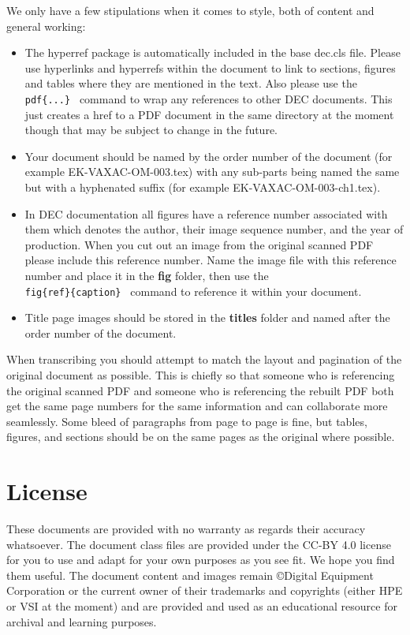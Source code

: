 \documentclass{dec}
\begin{document}
We only have a few stipulations when it comes to style, both of content and general working:

\begin{itemize}

\item	The hyperref package is automatically included in the base dec.cls file. Please use hyperlinks and hyperrefs within the document
		to link to sections, figures and tables where they are mentioned in the text. Also please use the {\tt \\pdf\{...\}\ } command to
		wrap any references to other DEC documents. This just creates a href to a PDF document in the same directory at the moment though
		that may be subject to change in the future.

\item	Your document should be named by the order number of the document (for example EK-VAXAC-OM-003.tex) with any sub-parts being named the same but
		with a hyphenated suffix (for example EK-VAXAC-OM-003-ch1.tex).

\item	In DEC documentation all figures have a reference number associated with them which denotes the author, their image sequence number, and the
		year of production. When you cut out an image from the original scanned PDF please include this reference number. Name the image file with
		this reference number and place it in the \textbf{fig} folder, then use the {\tt \\fig\{ref\}\{caption\}\ } command to reference it within
		your document.

\item	Title page images should be stored in the \textbf{titles} folder and named after the order number of the document.

\end{itemize}

When transcribing you should attempt to match the layout and pagination of the original document as possible. This is chiefly so that someone
who is referencing the original scanned PDF and someone who is referencing the rebuilt PDF both get the same page numbers for the same information and
can collaborate more seamlessly. Some bleed of paragraphs from page to page is fine, but tables, figures, and sections should be on the same pages
as the original where possible.

\section{License}

These documents are provided with no warranty as regards their accuracy whatsoever. The document class files are provided under the CC-BY 4.0 license
for you to use and adapt for your own purposes as you see fit. We hope you find them useful. The document content and images remain \copyright Digital
Equipment Corporation or the current owner of their trademarks and copyrights (either HPE or VSI at the moment) and are provided and used as an educational
resource for archival and learning purposes.
\end{document}
